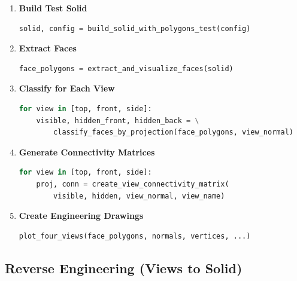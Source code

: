 \documentclass[11pt,a4paper]{article}
\begin{document}
\begin{enumerate}
    \item \textbf{Build Test Solid}
    \begin{lstlisting}[language=Python]
solid, config = build_solid_with_polygons_test(config)
    \end{lstlisting}
    
    \item \textbf{Extract Faces}
    \begin{lstlisting}[language=Python]
face_polygons = extract_and_visualize_faces(solid)
    \end{lstlisting}
    
    \item \textbf{Classify for Each View}
    \begin{lstlisting}[language=Python]
for view in [top, front, side]:
    visible, hidden_front, hidden_back = \
        classify_faces_by_projection(face_polygons, view_normal)
    \end{lstlisting}
    
    \item \textbf{Generate Connectivity Matrices}
    \begin{lstlisting}[language=Python]
for view in [top, front, side]:
    proj, conn = create_view_connectivity_matrix(
        visible, hidden, view_normal, view_name)
    \end{lstlisting}
    
    \item \textbf{Create Engineering Drawings}
    \begin{lstlisting}[language=Python]
plot_four_views(face_polygons, normals, vertices, ...)
    \end{lstlisting}
\end{enumerate}

\subsection{Reverse Engineering (Views to Solid)}
\end{document}
